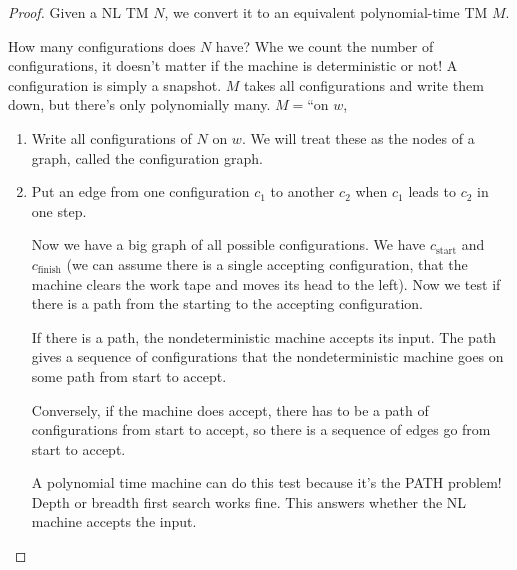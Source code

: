 \begin{proof}
Given a NL TM $N$, we convert it to an equivalent polynomial-time TM $M$.

How many configurations does $N$ have? Whe we count the number of configurations, it doesn't matter if the machine is deterministic or not! A configuration is simply a snapshot. $M$ takes all configurations and write them down, but there's only polynomially many. $M=$``on $w$,
\begin{enumerate}
\item
Write all configurations of $N$ on $w$. We will treat these as the nodes of a graph, called the configuration graph.
\item
Put an edge from one configuration $c_1$ to another $c_2$  when $c_1$ leads to $c_2$ in one step.

Now we have a big graph of all possible configurations. We have $c_{\text{start}}$ and $c_{\text{finish}}$ (we can assume there is a single accepting configuration, that the machine clears the work tape and moves its head to the left). Now we test if there is a path from the starting to the accepting configuration.

If there is a path, the nondeterministic machine accepts its input. The path gives a sequence of configurations that the nondeterministic machine goes on some path from start to accept. 

Conversely, if the machine does accept, there has to be a path of configurations from start to accept, so there is a sequence of edges go from start to accept.

A polynomial time machine can do this test because it's the PATH problem! Depth or breadth first search works fine. This answers whether the NL machine accepts the input.
\end{enumerate}
\end{proof}